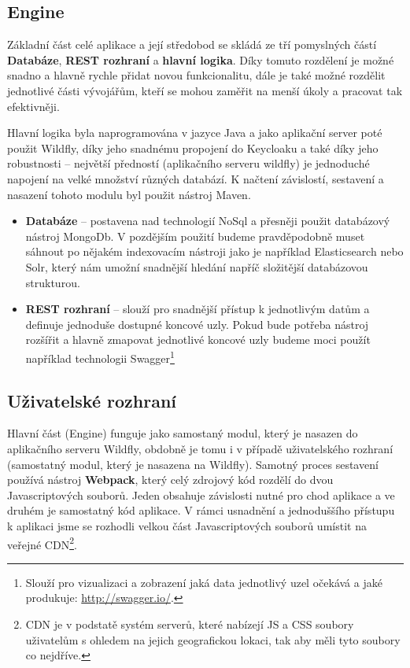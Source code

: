 \subsection{Engine}
\par Základní část celé aplikace a její středobod se skládá ze tří pomyslných částí \textbf{Databáze}, \textbf{REST rozhraní} a \textbf{hlavní logika}. Díky tomuto rozdělení je možné snadno a hlavně rychle přidat novou funkcionalitu, dále je také možné rozdělit jednotlivé části vývojářům, kteří se mohou zaměřit na menší úkoly a pracovat tak efektivněji.

\par Hlavní logika byla naprogramována v jazyce Java a jako aplikační server poté použit Wildfly, díky jeho snadnému propojení do Keycloaku a také díky jeho robustnosti -- největší předností (aplikačního serveru wildfly) je jednoduché napojení na velké množství různých databází. K načtení závislostí, sestavení a nasazení tohoto modulu byl použit nástroj Maven.

\begin{itemize}
\item \textbf{Databáze} --  postavena nad technologií NoSql a přesněji použit databázový nástroj MongoDb. V pozdějším použití budeme pravděpodobně muset sáhnout po nějakém indexovacím nástroji  jako je například Elasticsearch nebo Solr, který nám umožní snadnější hledání napříč složitější databázovou strukturou.
\item \textbf{REST rozhraní} -- slouží pro snadnější přístup k jednotlivým datům a definuje jednoduše dostupné koncové uzly. Pokud bude potřeba nástroj rozšířit a hlavně zmapovat jednotlivé koncové uzly budeme moci použít například technologii Swagger\footnote{Slouží pro vizualizaci a zobrazení jaká data jednotlivý uzel očekává a jaké produkuje: \url{http://swagger.io/}.}
\end{itemize}

\subsection{Uživatelské rozhraní}
\par Hlavní část (Engine) funguje jako samostaný modul, který je nasazen do aplikačního serveru Wildfly, obdobně je tomu i v případě uživatelského rozhraní (samostatný modul, který je nasazena na Wildfly). Samotný proces sestavení používá nástroj \textbf{Webpack}, který celý zdrojový kód rozdělí do dvou Javascriptových souborů. Jeden obsahuje závislosti nutné pro chod aplikace a ve druhém je samostatný kód aplikace. V rámci usnadnění a jednoduššího přístupu k aplikaci jsme se rozhodli velkou část Javascriptových souborů umístit na veřejné CDN\footnote{CDN je v podstatě systém serverů, které nabízejí JS a CSS soubory uživatelům s ohledem na jejich geografickou lokaci, tak aby měli tyto soubory co nejdříve.}.

